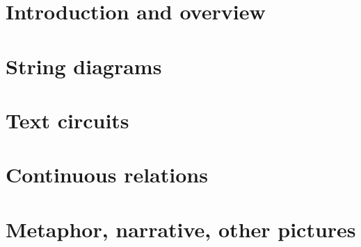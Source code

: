 



\maketitle%

\begin{fullwidth}
\begin{multicols}{2}
\tableofcontents
\end{multicols}
\end{fullwidth}

\setcounter{chapter}{-1}
\chapter{Introduction and overview}
\clearpage


\chapter{String diagrams}\label{chapter:stringdiagrams}


\clearpage

\clearpage

\clearpage

\clearpage
%

\chapter{Text circuits}
\clearpage


\clearpage

\chapter{Continuous relations}
\clearpage

\clearpage

\clearpage

\clearpage

\clearpage

\clearpage

\chapter{Metaphor, narrative, other pictures}
\clearpage


\clearpage






